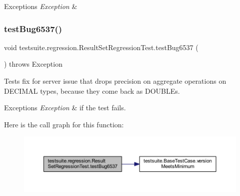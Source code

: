 \begin{DoxyExceptions}{Exceptions}
{\em Exception} & \\
\hline
\end{DoxyExceptions}
\mbox{\label{classtestsuite_1_1regression_1_1_result_set_regression_test_abe87e577ef06bd6b70aa3f685177c272}} 
\subsubsection{\texorpdfstring{test\+Bug6537()}{testBug6537()}}
{\footnotesize\ttfamily void testsuite.\+regression.\+Result\+Set\+Regression\+Test.\+test\+Bug6537 (\begin{DoxyParamCaption}{ }\end{DoxyParamCaption}) throws Exception}

Tests fix for server issue that drops precision on aggregate operations on D\+E\+C\+I\+M\+AL types, because they come back as D\+O\+U\+B\+L\+Es.


\begin{DoxyExceptions}{Exceptions}
{\em Exception} & if the test fails. \\
\hline
\end{DoxyExceptions}
Here is the call graph for this function\+:
\nopagebreak
\begin{figure}[H]
\begin{center}
\leavevmode
\includegraphics[width=350pt]{classtestsuite_1_1regression_1_1_result_set_regression_test_abe87e577ef06bd6b70aa3f685177c272_cgraph}
\end{center}
\end{figure}
\mbox{\label{classtestsuite_1_1regression_1_1_result_set_regression_test_aac9dd9e40e53b5f7b899b239d7c08406}} 
